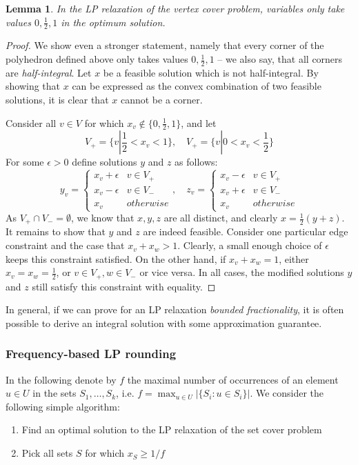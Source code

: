 \documentclass{article}
\newtheorem{lemma}{Lemma}
\begin{document}
\begin{lemma}
In the LP relaxation of the vertex cover problem, variables only take values $0,\frac{1}{2},1$ in the optimum solution.
\end{lemma}
\begin{proof}
We show even a stronger statement, namely that every corner of the polyhedron defined above only takes values $0,\frac{1}{2},1$ -- we also say, that all corners are \emph{half-integral}. Let $x$ be a feasible solution which 
is not half-integral. By showing that $x$ can be expressed as the convex combination of two feasible solutions, it is clear that $x$ cannot be a corner.

Consider all $v\in V$ for which $x_v\notin \{0,\frac{1}{2}, 1\}$, and let
\[
	V_+=\{v|\frac{1}{2}<x_v<1\},\quad V_+=\{v|0<x_v<\frac{1}{2}\}
\]
For some $\epsilon>0$ define solutions $y$ and $z$ as follows:
\[
	y_v= \left\{ \begin{array}{rl} x_v+\epsilon& v\in V_+\\ x_v-\epsilon& v\in V_-\\ x_v& otherwise \end{array} \right., \quad z_v= \left\{ \begin{array}{rl} x_v-\epsilon& v\in V_+\\ x_v+\epsilon& v\in V_-\\ x_v& otherwise \end{array} \right.
\]
As $V_+\cap V_-=\emptyset$, we know that $x, y, z$ are all distinct, and clearly $x=\frac{1}{2}(y+z)$. It remains to show that $y$ and $z$ are indeed feasible. Consider one particular edge constraint and the case that $x_v+x_w>1$. Clearly, a small enough choice of $\epsilon$ keeps this constraint satisfied. On the other hand, if $x_v+x_w=1$, either $x_v=x_w=\frac{1}{2}$, or $v\in V_+, w\in V_-$ or vice versa. In all cases, the modified solutions $y$ and $z$ still satisfy this constraint with equality. 
\end{proof}
In general, if we can prove for an LP relaxation \emph{bounded fractionality}, it is often possible to derive an integral solution with some approximation guarantee.

\subsubsection{Frequency-based LP rounding}
In the following denote by $f$ the maximal number of occurrences of an element $u\in U$ in the sets $S_1,\dots, S_k$, i.e.
$f=\max_{u\in U} |\{S_i: u\in S_i\}|$. We consider the following simple algorithm:
\begin{enumerate}
\item Find an optimal solution to the LP relaxation of the set cover problem
\item Pick all sets $S$ for which $x_S\geq 1/f$
\end{enumerate}
\end{document}
